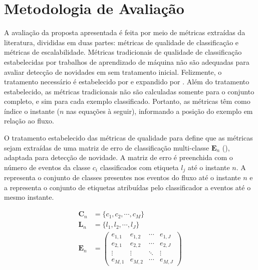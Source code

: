 \section{Metodologia de Avaliação}\label{sec:esperados}


A avaliação da proposta apresentada é feita por meio de métricas extraídas da
literatura, divididas em duas partes: métricas de qualidade de classificação
e métricas de escalabilidade.
Métricas tradicionais de qualidade de classificação estabelecidas por trabalhos
de aprendizado de máquina não são adequadas para avaliar detecção de novidades em
\streams sem tratamento inicial. Felizmente, o tratamento necessário é
estabelecido por  e expandido por
.
Além do tratamento estabelecido, as métricas tradicionais não são calculadas
somente para o conjunto completo, e sim para cada exemplo classificado.
Portanto, as métricas têm como índice o instante ($n$ nas equações à seguir),
informando a posição do exemplo em relação ao fluxo.

O tratamento estabelecido das métricas de qualidade para \streamMining define
que as métricas sejam extraídas de uma matriz de erro de classificação
multi-classe $\mathbf{E}_n$ (), adaptada para detecção de
novidade.
A matriz de erro é preenchida com o número de eventos da classe $c_i$ classificados com
etiqueta $l_j$ até o instante $n$.
A  representa o conjunto de classes presentes nos eventos
do fluxo até o instante $n$ e a  representa o conjunto
de etiquetas atribuídas pelo classificador a eventos até o mesmo instante.

\begin{align}
  \mathbf{C}_n &= \{ c_1, c_2, \cdots, c_M \}  \label{eq:classes} \\
  \mathbf{L}_n &= \{ l_1, l_2, \cdots, l_J \}  \label{eq:labels} \\
  \mathbf{E}_n &= \begin{pmatrix}
    e_{1,1} & e_{1,2} & \cdots & e_{1,J} \\
    e_{2,1} & e_{2,2} & \cdots & e_{2,J} \\
    \vdots  & \vdots  & \ddots & \vdots  \\
    e_{M,1} & e_{M,2} & \cdots & e_{M,J} 
  \end{pmatrix}  \label{eq:matrix}
\end{align}

